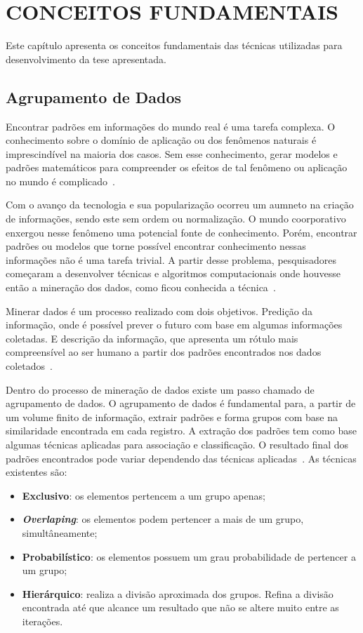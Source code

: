 \chapter{CONCEITOS FUNDAMENTAIS}
\label{cap:ai}
Este capítulo apresenta os conceitos fundamentais das técnicas utilizadas para desenvolvimento da tese apresentada.

\section{Agrupamento de Dados}
\label{sec:clustering}
Encontrar padrões em informações do mundo real é uma tarefa complexa. O conhecimento sobre o domínio de aplicação ou dos fenômenos naturais é imprescindível na maioria dos casos. Sem esse conhecimento, gerar modelos e padrões matemáticos para compreender os efeitos de tal fenômeno ou aplicação no mundo é complicado~\cite{kantardzic:2011}.

Com o avanço da tecnologia e sua popularização ocorreu um aumneto na criação de informações, sendo este sem ordem ou normalização. O mundo coorporativo enxergou nesse fenômeno uma potencial fonte de conhecimento. Porém, encontrar padrões ou modelos que torne possível encontrar conhecimento nessas informações não é uma tarefa trivial. A partir desse problema, pesquisadores começaram a desenvolver técnicas e algoritmos computacionais onde houvesse então a mineração dos dados, como ficou conhecida a técnica~\cite{jain:1999, kantardzic:2011}.

Minerar dados é um processo realizado com dois objetivos. Predição da informação, onde é possível prever o futuro com base em algumas informações coletadas. E descrição da informação, que apresenta um rótulo mais compreensível ao ser humano a partir dos padrões encontrados nos dados coletados~\cite{jain:1999}.

Dentro do processo de mineração de dados existe um passo chamado de agrupamento de dados. O agrupamento de dados é fundamental para, a partir de um volume finito de informação, extrair padrões e forma grupos com base na similaridade encontrada em cada registro. A extração dos padrões tem como base algumas técnicas aplicadas para associação e classificação. O resultado final dos padrões encontrados pode variar dependendo das técnicas aplicadas~\cite{kantardzic:2011, witten:2011}. As técnicas existentes são:

\begin{itemize}
    \item \textbf{Exclusivo}: os elementos pertencem a um grupo apenas;
    \item \textbf{\emph{Overlaping}}: os elementos podem pertencer a mais de um grupo, simultâneamente;
    \item \textbf{Probabilístico}: os elementos possuem um grau probabilidade de pertencer a um grupo;
    \item \textbf{Hierárquico}: realiza a divisão aproximada dos grupos. Refina a divisão encontrada até que alcance um resultado que não se altere muito entre as iterações.
\end{itemize}

